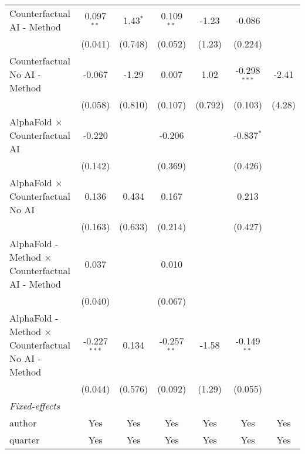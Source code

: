 \begin{tabular}{lcccccc}
   Counterfactual AI - Method                                 & 0.097$^{**}$   & 1.43$^{*}$ & 0.109$^{**}$  & -1.23        & -0.086         &   \\   
                                                              & (0.041)        & (0.748)    & (0.052)       & (1.23)       & (0.224)        &   \\   
   Counterfactual No AI - Method                              & -0.067         & -1.29      & 0.007         & 1.02         & -0.298$^{***}$ & -2.41\\   
                                                              & (0.058)        & (0.810)    & (0.107)       & (0.792)      & (0.103)        & (4.28)\\   
   AlphaFold $\times$ Counterfactual AI                       & -0.220         &            & -0.206        &              & -0.837$^{*}$   &   \\   
                                                              & (0.142)        &            & (0.369)       &              & (0.426)        &   \\   
   AlphaFold $\times$ Counterfactual No AI                    & 0.136          & 0.434      & 0.167         &              & 0.213          &   \\   
                                                              & (0.163)        & (0.633)    & (0.214)       &              & (0.427)        &   \\   
   AlphaFold - Method $\times$ Counterfactual AI - Method     & 0.037          &            & 0.010         &              &                &   \\   
                                                              & (0.040)        &            & (0.067)       &              &                &   \\   
   AlphaFold - Method $\times$ Counterfactual No AI - Method  & -0.227$^{***}$ & 0.134      & -0.257$^{**}$ & -1.58        & -0.149$^{**}$  &   \\   
                                                              & (0.044)        & (0.576)    & (0.092)       & (1.29)       & (0.055)        &   \\   
   \midrule
   \emph{Fixed-effects}\\
   author                                                     & Yes            & Yes        & Yes           & Yes          & Yes            & Yes\\  
   quarter                                                    & Yes            & Yes        & Yes           & Yes          & Yes            & Yes\\  

\end{tabular}
